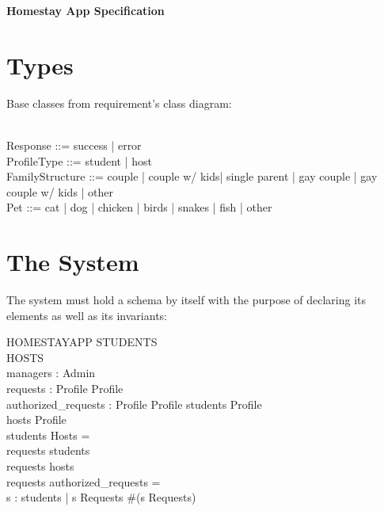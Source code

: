 \documentclass[11pt]{article}
\begin{document}
\begin{center}\LARGE
	\textbf{Homestay App Specification}
\end{center}

\section*{Types}
Base classes from requirement's class diagram:
\begin{zed}
\\
Response ::= success | error\\
ProfileType ::= student | host\\
FamilyStructure ::= couple | couple w/ kids| single parent | gay couple | gay couple w/ kids | other\\
Pet ::= cat | dog | chicken | birds | snakes | fish | other\\
\end{zed}


\section*{The System}
The system must hold a schema by itself with the purpose of declaring its elements as well as its invariants:
\begin{schema}{HOMESTAYAPP}
	\Xi STUDENTS\\
	\Xi HOSTS\\
	managers : \power Admin\\
	requests : Profile \rightarrow Profile\\
	authorized\_requests : Profile \rightarrow Profile
\where
	students \subseteq Profile\\
	hosts \subseteq Profile\\
	students \cap Hosts = \emptyset\\
	\dom requests \subset students\\
	\ran requests \subset hosts\\
	requests \cap authorized_requests = \emptyset\\
	\forall s : students | s \in \dom Requests \bullet \#(s \dres Requests) 
\end{schema}

\end{document}
